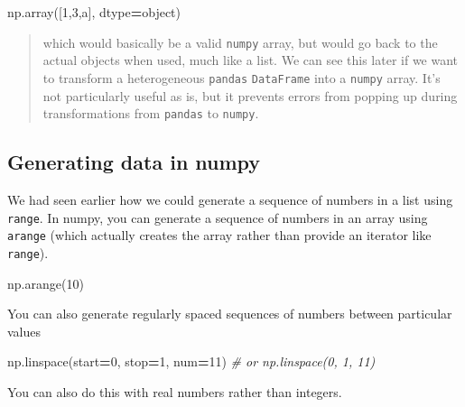 \documentclass[
  letterpaper,
]{scrbook}
\newenvironment{Shaded}{\begin{snugshade}}{\end{snugshade}}
\newcommand{\CommentTok}[1]{\textcolor[rgb]{0.56,0.35,0.01}{\textit{#1}}}
\newcommand{\DecValTok}[1]{\textcolor[rgb]{0.00,0.00,0.81}{#1}}
\newcommand{\NormalTok}[1]{#1}
\newcommand{\OperatorTok}[1]{\textcolor[rgb]{0.81,0.36,0.00}{\textbf{#1}}}
\newcommand{\StringTok}[1]{\textcolor[rgb]{0.31,0.60,0.02}{#1}}
\begin{document}
\begin{Shaded}
\begin{Highlighting}[]
\NormalTok{np.array([}\DecValTok{1}\NormalTok{,}\DecValTok{3}\NormalTok{,}\StringTok{\textquotesingle{}a\textquotesingle{}}\NormalTok{], dtype}\OperatorTok{=}\StringTok{\textquotesingle{}object\textquotesingle{}}\NormalTok{)}
\end{Highlighting}
\end{Shaded}

\begin{quote}
which would basically be a valid \texttt{numpy} array, but would go back to the actual objects when used, much like a list. We can see this later if we want to transform a heterogeneous \texttt{pandas} \texttt{DataFrame} into a \texttt{numpy} array. It's not particularly useful as is, but it prevents errors from popping up during transformations from \texttt{pandas} to \texttt{numpy}.
\end{quote}

\hypertarget{generating-data-in-numpy}{%
\subsection{Generating data in numpy}\label{generating-data-in-numpy}}

We had seen earlier how we could generate a sequence of numbers in a list using \texttt{range}. In numpy, you can generate a sequence of numbers in an array using \texttt{arange} (which actually creates the array rather than provide an iterator like \texttt{range}).

\begin{Shaded}
\begin{Highlighting}[]
\NormalTok{np.arange(}\DecValTok{10}\NormalTok{)}
\end{Highlighting}
\end{Shaded}

You can also generate regularly spaced sequences of numbers between particular values

\begin{Shaded}
\begin{Highlighting}[]
\NormalTok{np.linspace(start}\OperatorTok{=}\DecValTok{0}\NormalTok{, stop}\OperatorTok{=}\DecValTok{1}\NormalTok{, num}\OperatorTok{=}\DecValTok{11}\NormalTok{) }\CommentTok{\# or np.linspace(0, 1, 11)}
\end{Highlighting}
\end{Shaded}

You can also do this with real numbers rather than integers.
\end{document}
